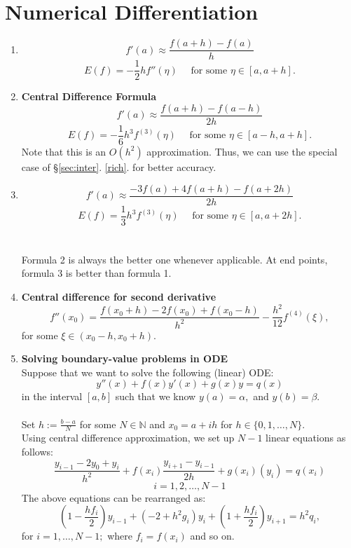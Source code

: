 \documentclass{article}
\begin{document}
\section{Numerical Differentiation}
\begin{enumerate} 
	\itemsep1em
	\item \[f'(a) \approx \frac{f(a + h) - f(a)}{h}\]
	\[E(f) = -\frac{1}{2}hf''(\eta) \quad \text{ for some }\eta\in[a, a+h].\]
	\item \textbf{Central Difference Formula}\\
	\[f'(a) \approx \frac{f(a + h) - f(a-h)}{2h}\]
	\[E(f) = -\frac{1}{6}h^3f^{(3)}(\eta) \quad \text{ for some }\eta\in[a-h, a+h].\]
	Note that this is an $O(h^2)$ approximation. Thus, we can use the special case of \S\ref{sec:inter}. \ref{rich}. for better accuracy.
	\item \[f'(a) \approx \frac{-3f(a) + 4f(a + h) - f(a + 2h)}{2h}\]
	\[E(f) = \frac{1}{3}h^3f^{(3)}(\eta) \quad \text{ for some }\eta\in[a, a+2h].\]\\
	\\
	Formula 2 is always the better one whenever applicable. At end points, formula 3 is better than formula 1.
	\item \textbf{Central difference for second derivative}\\
	\[f''(x_0) = \frac{f(x_0 + h) - 2f(x_0) + f(x_0 - h)}{h^2} - \frac{h^2}{12}f^{(4)}(\xi),\]
	for some $\xi \in (x_0 - h, x_0 + h).$
	\item \textbf{Solving boundary-value problems in ODE}\\
	Suppose that we want to solve the following (linear) ODE:
	\[y''(x) + f(x)y'(x) + g(x)y = q(x)\]
	in the interval $[a, b]$ such that we know $y(a) = \alpha,$ and $y(b) = \beta.$ \\~\\
	Set $h := \frac{b - a}{N}$ for some $N \in \mathbb{N}$ and $x_0 = a + ih$ for $h \in \{0, 1, \ldots, N\}.$\\
	Using central difference approximation, we set up $N-1$ linear equations as follows:
	\[\frac{y_{i-1} - 2y_0 + y_i}{h^2} + f(x_i)\frac{y_{i+1} - y_{i-1}}{2h} + g(x_i)(y_i) = q(x_i)\]
	\[i = 1, 2, \ldots, N-1\]
	The above equations can be rearranged as:
	\[\left(1 - \frac{hf_i}{2}\right)y_{i-1} + (-2 + h^2g_i)y_i + \left(1 + \frac{hf_i}{2}\right)y_{i+1} = h^2q_i,\]
	for $i = 1, \ldots, N-1;$ where $f_i = f(x_i)$ and so on.\\
\end{enumerate}
\end{document}
